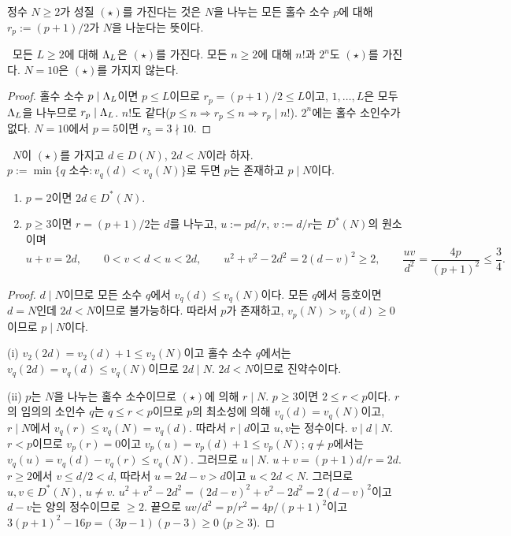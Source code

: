 \begin{definition}[성질 $(\star)$]\label{STRUCT:def-star}
정수 $N\ge2$가 성질 $(\star)$를 가진다는 것은 $N$을 나누는 모든 홀수 소수 $p$에 대해 $r_p:=(p+1)/2$가 $N$을 나눈다는 뜻이다.
\end{definition}

\begin{lemma}\label{STRUCT:lem-star-examples}
\PROVED\ 모든 $L\ge 2$에 대해 $\Lambda_L$은 $(\star)$를 가진다. 모든 $n\ge2$에 대해 $n!$과 $2^n$도 $(\star)$를 가진다. $N=10$은 $(\star)$를 가지지 않는다.
\end{lemma}
\begin{proof}
홀수 소수 $p\mid\Lambda_L$이면 $p\le L$이므로 $r_p=(p+1)/2\le L$이고, $1,\dots,L$은 모두 $\Lambda_L$을 나누므로 $r_p\mid\Lambda_L$.
$n!$도 같다($p\le n\Rightarrow r_p\le n\Rightarrow r_p\mid n!$). $2^n$에는 홀수 소인수가 없다.
$N=10$에서 $p=5$이면 $r_5=3\nmid 10$.
\end{proof}

\begin{lemma}[중복쌍 교환]\label{STRUCT:lem-swap}
\PROVED\ $N$이 $(\star)$를 가지고 $d\in D(N)$, $2d<N$이라 하자. $p:=\min\{q \text{ 소수}: v_q(d)<v_q(N)\}$로 두면 $p$는 존재하고 $p\mid N$이다.
\begin{enumerate}[label=(\roman*)]
\item $p=2$이면 $2d\in D^*(N)$.
\item $p\ge3$이면 $r=(p+1)/2$는 $d$를 나누고, $u:=pd/r$, $v:=d/r$는 $D^*(N)$의 원소이며
\[
u+v=2d,\qquad 0<v<d<u<2d,\qquad u^2+v^2-2d^2=2(d-v)^2\ge2,\qquad \frac{uv}{d^2}=\frac{4p}{(p+1)^2}\le\frac34 .
\]
\end{enumerate}
\end{lemma}
\begin{proof}
$d\mid N$이므로 모든 소수 $q$에서 $v_q(d)\le v_q(N)$이다. 모든 $q$에서 등호이면 $d=N$인데 $2d<N$이므로 불가능하다. 따라서 $p$가 존재하고, $v_p(N)>v_p(d)\ge0$이므로 $p\mid N$이다.

(i) $v_2(2d)=v_2(d)+1\le v_2(N)$이고 홀수 소수 $q$에서는 $v_q(2d)=v_q(d)\le v_q(N)$이므로 $2d\mid N$. $2d<N$이므로 진약수이다.

(ii) $p$는 $N$을 나누는 홀수 소수이므로 $(\star)$에 의해 $r\mid N$. $p\ge3$이면 $2\le r<p$이다. $r$의 임의의 소인수 $q$는 $q\le r<p$이므로 $p$의 최소성에 의해 $v_q(d)=v_q(N)$이고, $r\mid N$에서 $v_q(r)\le v_q(N)=v_q(d)$. 따라서 $r\mid d$이고 $u,v$는 정수이다.
$v\mid d\mid N$. $r<p$이므로 $v_p(r)=0$이고 $v_p(u)=v_p(d)+1\le v_p(N)$; $q\ne p$에서는 $v_q(u)=v_q(d)-v_q(r)\le v_q(N)$. 그러므로 $u\mid N$.
$u+v=(p+1)d/r=2d$. $r\ge2$에서 $v\le d/2<d$, 따라서 $u=2d-v>d$이고 $u<2d<N$. 그러므로 $u,v\in D^*(N)$, $u\ne v$.
$u^2+v^2-2d^2=(2d-v)^2+v^2-2d^2=2(d-v)^2$이고 $d-v$는 양의 정수이므로 $\ge2$.
끝으로 $uv/d^2=p/r^2=4p/(p+1)^2$이고 $3(p+1)^2-16p=(3p-1)(p-3)\ge0$ ($p\ge3$).
\end{proof}

